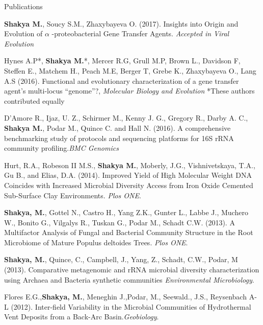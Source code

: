 \documentclass{resume} %
\begin{document}

\begin{rSection}{Publications}

\item \textbf{Shakya M.}, Soucy S.M., Zhaxybayeva O. (2017). Insights into Origin and Evolution of $\alpha$ -proteobacterial Gene Transfer Agents. \textit{Accepted in Viral Evolution}
\item Hynes A.P*, \textbf{Shakya M.}*, Mercer R.G, Grull M.P, Brown L., Davidson F, Steffen E., Matchem H., Peach M.E, Berger T, Grebe K., Zhaxybayeva O., Lang A.S (2016). Functional and evolutionary characterization of a gene transfer agent's multi-locus ``genome''?, \textit{Molecular Biology and Evolution} *{\tiny These authors contributed equally}
\item D’Amore R., Ijaz, U. Z., Schirmer M., Kenny J. G., Gregory R., Darby A. C., \textbf{Shakya M.}, Podar M., Quince C. and Hall N. (2016). A comprehensive benchmarking study of protocols and sequencing platforms for 16S rRNA community profiling.\textit{BMC Genomics} 
\item Hurt, R.A., Robeson II M.S., \textbf{Shakya M.}, Moberly, J.G., Vishnivetskaya, T.A., Gu B., and Elias, D.A. (2014). Improved Yield of High Molecular Weight DNA Coincides with Increased Microbial Diversity Access from Iron Oxide Cemented Sub-Surface Clay Environments. \textit{Plos ONE}. 
 \item \textbf{Shakya, M.}, Gottel N., Castro H., Yang Z.K., Gunter L., Labbe J., Muchero W., Bonito G., Vilgalys R., Tuskan G., Podar M., Schadt C.W. (2013). A Multifactor Analysis of Fungal and Bacterial Community Structure in the Root Microbiome of Mature Populus deltoides Trees. \textit{Plos ONE}. 
\item \textbf{Shakya, M.}, Quince, C., Campbell, J., Yang, Z., Schadt, C.W., Podar, M (2013). Comparative metagenomic and rRNA microbial diversity characterization using Archaea and Bacteria synthetic communities \textit{Environmental Microbiology}.
\item Flores E.G.,\textbf{Shakya, M.}, Meneghin J.,Podar, M., Seewald., J.S., Reysenbach A-L (2012). Inter-field Variability in the Microbial Communities of Hydrothermal Vent Deposits from a Back-Arc Basin.\textit{Geobiology}. 
\end{rSection}
\end{document}
